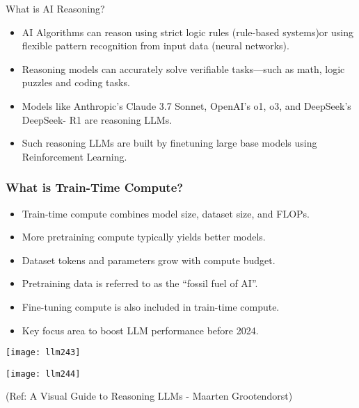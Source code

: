 \begin{frame}[fragile]{What is AI Reasoning?}
    \begin{itemize}
        \item AI Algorithms can reason using strict logic rules (rule-based systems)or using flexible 
pattern recognition from input data (neural networks). 
        \item Reasoning models can accurately solve verifiable tasks—such as math, logic puzzles and coding 
tasks.
        \item Models like Anthropic's Claude 3.7 Sonnet, OpenAI's o1, o3, and DeepSeek's DeepSeek- R1 
are reasoning LLMs. 
        \item Such reasoning LLMs are built by finetuning large base models using Reinforcement Learning.
    \end{itemize}
\end{frame}


\begin{frame}[fragile]\frametitle{What is Train-Time Compute?}

      \begin{itemize}
        \item Train-time compute combines model size, dataset size, and FLOPs.
        \item More pretraining compute typically yields better models.
        \item Dataset tokens and parameters grow with compute budget.
        \item Pretraining data is referred to as the “fossil fuel of AI”.
        \item Fine-tuning compute is also included in train-time compute.
        \item Key focus area to boost LLM performance before 2024.
      \end{itemize}

        \begin{center}
        \texttt{[image: llm243]}
		
        \texttt{[image: llm244]}
		

		{\tiny (Ref: A Visual Guide to Reasoning LLMs - Maarten Grootendorst)}
		
        \end{center}    

\end{frame}

